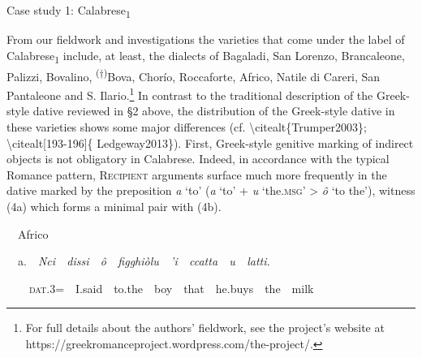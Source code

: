 \documentclass[output=paper,modfonts,nonflat]{langsci/langscibook}
\begin{document}
\setcounter{listWWNumxileveli}{0}
\begin{listWWNumxileveli}
\item 

\setcounter{listWWNumxilevelii}{0}
\begin{listWWNumxilevelii}
\item 
\begin{stylelsSectionii}
Case study 1: Calabrese\textsubscript{1}
\end{stylelsSectionii}
\end{listWWNumxilevelii}
\end{listWWNumxileveli}
\begin{styleStandard}
From our fieldwork and investigations the varieties that come under the label of Calabrese\textsubscript{1} include, at least, the dialects of Bagaladi, San Lorenzo, Brancaleone, Palizzi, Bovalino, \textsuperscript{(†)}Bova, Chorío, Roccaforte, Africo, Natile di Careri, San Pantaleone and S. Ilario.\footnote{ For full details about the authors’ fieldwork, see the project’s website at https://greekromanceproject.wordpress.com/the-project/.} In contrast to the traditional description of the Greek-style dative reviewed in §2 above, the distribution of the Greek-style dative in these varieties shows some major differences (cf. {\textbackslash}citealt\{Trumper2003\}; {\textbackslash}citealt[193-196]\{ Ledgeway2013\}). First, Greek-style genitive marking of indirect objects is not obligatory in Calabrese. Indeed, in accordance with the typical Romance pattern,\textsc{ Recipient} arguments surface much more frequently in the dative marked by the preposition \textit{a }‘to’ (\textit{a }‘to’ + \textit{u }‘the.\textsc{msg}’ {\textgreater} \textit{ô }‘to the’), witness (4a) which forms a minimal pair with (4b).
\end{styleStandard}


\setcounter{listWWNumviiileveli}{0}
\begin{listWWNumviiileveli}
\item 
\begin{styleListParagraph}
\ \ Africo
\end{styleListParagraph}
\end{listWWNumviiileveli}
\begin{styleListParagraph}
\ \ a.\ \ \textit{Nci\ \ dissi\ \ ô\ \ figghiòlu\ \ ’i\ \ ccatta\ \ u\ \ latti.}
\end{styleListParagraph}

\begin{styleStandard}
\ \ \ \ \textsc{dat}.3=\ \ I.said\ \ to.the\ \ boy\ \ that\ \ he.buys\ \ the\ \ milk
\end{styleStandard}
\end{document}
